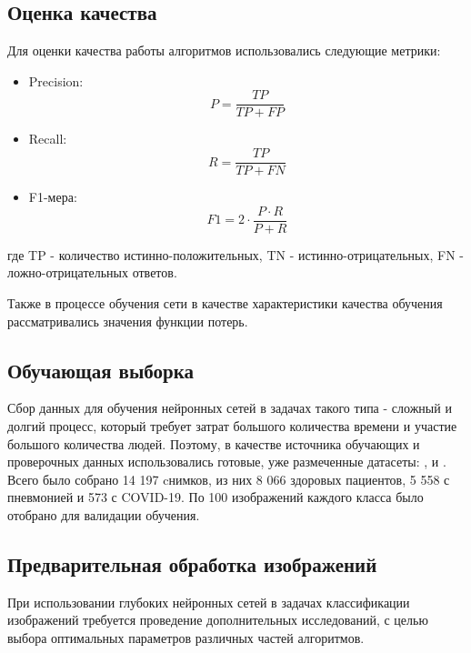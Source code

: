 \subsection{Оценка качества}
Для оценки качества работы алгоритмов использовались следующие метрики:
\begin{itemize}
    \item Precision: \[P = \frac{TP}{TP+FP}\]
    \item Recall: \[R=\frac{TP}{TP+FN}\] 
    \item F1-мера: \[F1=2 \cdot \frac{P \cdot R}{P+R}\] 
\end{itemize}
где TP - количество истинно-положительных, TN - истинно-отрицательных, 
FN - ложно-отрицательных ответов.

Также в процессе обучения сети в качестве характеристики качества обучения рассматривались значения функции потерь.

\subsection{Обучающая выборка}
Сбор данных для обучения нейронных сетей в задачах такого типа - сложный и долгий процесс, который требует затрат большого количества времени и участие большого количества людей. Поэтому, в качестве источника обучающих и проверочных данных использовались готовые, уже размеченные датасеты: \cite{tawsifurrahman}, \cite{cohen2020covid} и \cite{wang2020covidnet}. 
Всего было собрано 14 197 cнимков, из них 8 066 здоровых пациентов, 5 558 с пневмонией и 573 с COVID-19. По 100 изображений каждого класса было отобрано для валидации обучения.


% 

\subsection{Предварительная обработка изображений}

При использовании глубоких нейронных сетей в задачах классификации изображений требуется проведение дополнительных исследований, с целью выбора оптимальных параметров различных частей алгоритмов. 

